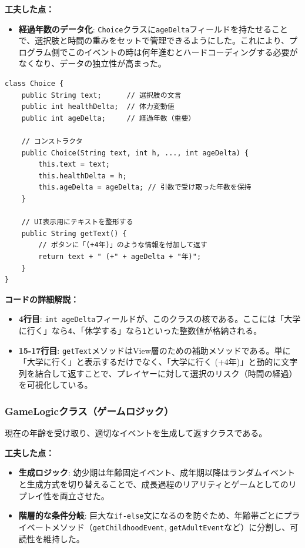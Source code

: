 \documentclass[a4paper,11pt]{jsarticle}
\begin{document}
\textbf{工夫した点：}
\begin{itemize}
    \item \textbf{経過年数のデータ化}: \texttt{Choice}クラスに\texttt{ageDelta}フィールドを持たせることで、選択肢と時間の重みをセットで管理できるようにした。これにより、プログラム側でこのイベントの時は何年進むとハードコーディングする必要がなくなり、データの独立性が高まった。
\end{itemize}

\begin{lstlisting}[caption=Choice.java（データ構造）, label=code:choice_detail]
class Choice {
    public String text;      // 選択肢の文言
    public int healthDelta;  // 体力変動値
    public int ageDelta;     // 経過年数（重要）

    // コンストラクタ
    public Choice(String text, int h, ..., int ageDelta) {
        this.text = text;
        this.healthDelta = h;
        this.ageDelta = ageDelta; // 引数で受け取った年数を保持
    }
    
    // UI表示用にテキストを整形する
    public String getText() {
        // ボタンに「(+4年)」のような情報を付加して返す
        return text + " (+" + ageDelta + "年)";
    }
}
\end{lstlisting}

\textbf{コードの詳細解説：}
\begin{itemize}
    \item \textbf{4行目}: \texttt{int ageDelta}フィールドが、このクラスの核である。ここには「大学に行く」なら\texttt{4}、「休学する」なら\texttt{1}といった整数値が格納される。
    \item \textbf{15-17行目}: \texttt{getText}メソッドはView層のための補助メソッドである。単に「大学に行く」と表示するだけでなく、「大学に行く (+4年)」と動的に文字列を結合して返すことで、プレイヤーに対して選択のリスク（時間の経過）を可視化している。
\end{itemize}

\subsubsection{GameLogicクラス（ゲームロジック）}
現在の年齢を受け取り、適切なイベントを生成して返すクラスである。

\textbf{工夫した点：}
\begin{itemize}
    \item \textbf{生成ロジック}: 幼少期は年齢固定イベント、成年期以降はランダムイベントと生成方式を切り替えることで、成長過程のリアリティとゲームとしてのリプレイ性を両立させた。
    \item \textbf{階層的な条件分岐}: 巨大な\texttt{if-else}文になるのを防ぐため、年齢帯ごとにプライベートメソッド（\texttt{getChildhoodEvent}, \texttt{getAdultEvent}など）に分割し、可読性を維持した。
\end{itemize}
\end{document}
